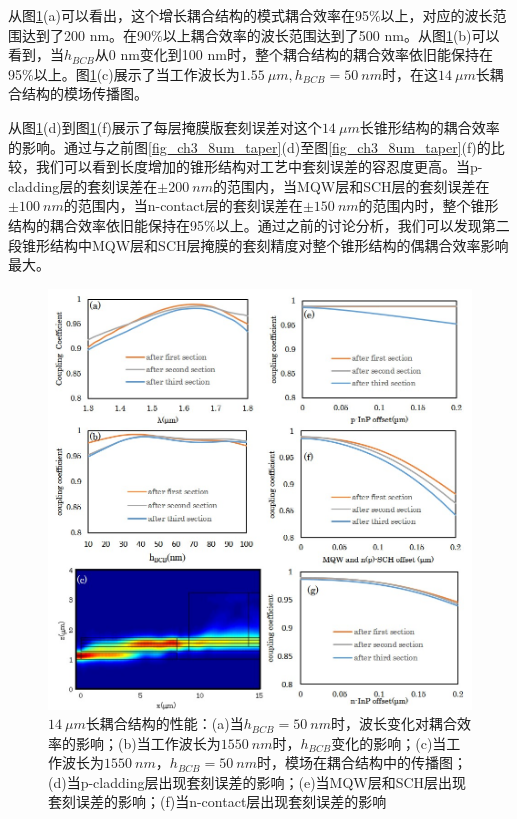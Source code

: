 从图\ref{fig_ch3_14um_taper}(a)可以看出，这个增长耦合结构的模式耦合效率在95\%以上，对应的波长范围达到了200 nm。在90\%以上耦合效率的波长范围达到了500 nm。从图\ref{fig_ch3_14um_taper}(b)可以看到，当$h_{BCB}$从0 nm变化到100 nm时，整个耦合结构的耦合效率依旧能保持在95\%以上。图\ref{fig_ch3_14um_taper}(c)展示了当工作波长为$1.55 ~\mu m, h_{BCB} = 50~nm$时，在这$14~\mu m$长耦合结构的模场传播图。

从图\ref{fig_ch3_14um_taper}(d)到图\ref{fig_ch3_14um_taper}(f)展示了每层掩膜版套刻误差对这个$14~\mu m$长锥形结构的耦合效率的影响。通过与之前图\ref{fig_ch3_8um_taper}(d)至图\ref{fig_ch3_8um_taper}(f)的比较，我们可以看到长度增加的锥形结构对工艺中套刻误差的容忍度更高。当p-cladding层的套刻误差在$\pm 200~nm$的范围内，当MQW层和SCH层的套刻误差在$\pm 100~nm$的范围内，当n-contact层的套刻误差在$\pm 150~nm$的范围内时，整个锥形结构的耦合效率依旧能保持在95\%以上。通过之前的讨论分析，我们可以发现第二段锥形结构中MQW层和SCH层掩膜的套刻精度对整个锥形结构的偶耦合效率影响最大。

\begin{figure}[htb]
	\centering
	\includegraphics[width=14cm]{./Pictures/fig_ch3_14um_taper.jpg}
	\caption{$14~\mu m$长耦合结构的性能：(a)当$h_{BCB}=50~nm$时，波长变化对耦合效率的影响；(b)当工作波长为$1550~nm$时，$h_{BCB}$变化的影响；(c)当工作波长为$1550~nm$，$h_{BCB}=50~nm$时，模场在耦合结构中的传播图；(d)当p-cladding层出现套刻误差的影响；(e)当MQW层和SCH层出现套刻误差的影响；(f)当n-contact层出现套刻误差的影响}
	\label{fig_ch3_14um_taper}
\end{figure}

